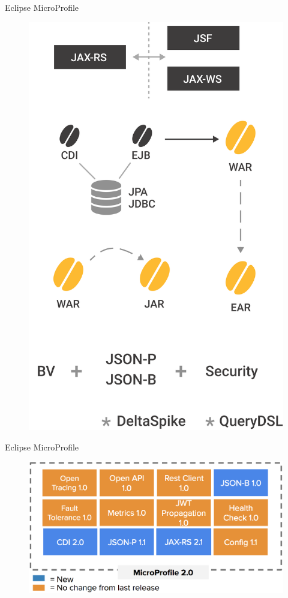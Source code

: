 \documentclass{beamer}
\begin{document}
\begin{frame}{Eclipse MicroProfile}
	\begin{figure}
		\centering
		\includegraphics[width=0.5\linewidth]{Images/oldsetup}
	\end{figure}
\end{frame}

\begin{frame}{Eclipse MicroProfile}
\begin{figure}
	\centering
	\includegraphics[width=\linewidth]{Images/mp5}
\end{figure}
\end{frame}

\end{document}
